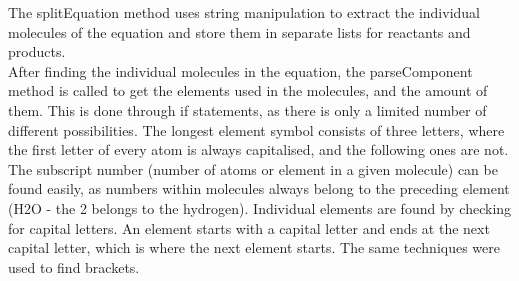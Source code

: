 \documentclass[a4paper,12pt]{article}
\begin{document}
The splitEquation method uses string manipulation to extract the individual molecules of the equation and store them in separate lists for reactants and products.\\
After finding the individual molecules in the equation, the parseComponent method is called to get the elements used in the molecules, and the amount of them. This is done through if statements, as there is only a limited number of different possibilities. The longest element symbol consists of three letters, where the first letter of every atom is always capitalised, and the following ones are not. The subscript number (number of atoms or element in a given molecule) can be found easily, as numbers within molecules always belong to the preceding element (H2O - the 2 belongs to the hydrogen). Individual elements are found by checking for capital letters. An element starts with a capital letter and ends at the next capital letter, which is where the next element starts. The same techniques were used to find brackets.
\end{document}

